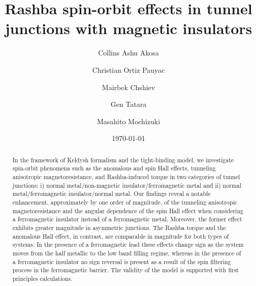 \documentclass[10pt,pr,twocolumn,showpacs,amssymb,floatfix,superscriptaddress]{revtex4-1}
\begin{document}
\title{ Rashba spin-orbit effects in tunnel junctions with magnetic insulators}


\author{Collins Ashu Akosa}
%
\author{Christian Ortiz Pauyac}
%
%
%
\author{Mairbek Chshiev}

%
\author{Gen Tatara}

\author{Masahito Mochizuki}

\date{\today}




\begin{abstract}
In the framework of Keldysh formalism and the tight-binding model, we investigate spin-orbit phenomena such as the anomalous and spin Hall effects, tunneling anisotropic magnetoresistance, 
and Rashba-induced torque in two categories of tunnel junctions: 
i) normal metal/non-magnetic insulator/ferromagnetic metal and ii) normal metal/ferromagnetic insulator/normal metal. 
Our findings reveal a notable enhancement, approximately by one order of magnitude, of the tunneling anisotropic
magnetoresistance and the angular dependence of the spin Hall effect when considering a ferromagnetic insulator instead of a ferromagnetic metal. Moreover, the former effect exhibits greater magnitude in asymmetric junctions.
The Rashba torque and the anomalous Hall effect, in contrast, are comparable in magnitude for both types of systems. 
In the presence of a ferromagnetic lead these effects change sign as the system moves from the half metallic to the low band filling regime, whereas in the presence of a ferromagnetic insulator no sign reversal is present as a result of the spin filtering process in the ferromagnetic barrier. The validity of the model is supported with first principles calculations.
\end{abstract}
\maketitle
\end{document}
